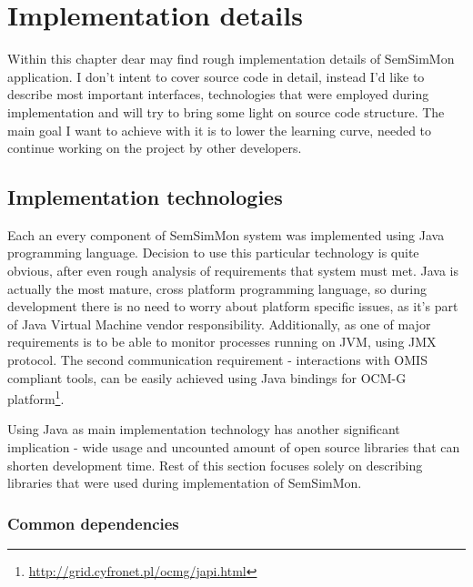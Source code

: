  
%


\chapter{Implementation details}
\label{cha:implementation}

Within this chapter dear may find rough implementation details of SemSimMon application. I don't intent to cover
source code in detail, instead I'd like to describe most important interfaces, technologies  that were
employed during implementation and will try to bring some light on source code structure. The main goal I want to
achieve with it is to lower the learning curve, needed to continue working on the project by other developers.


\section{Implementation technologies}

Each an every component of SemSimMon system was implemented using Java programming language. Decision to use this
particular technology is quite obvious, after even rough analysis of requirements that system must met. Java is
actually the most mature, cross platform programming language, so during development there is no need to worry about
platform specific issues, as it's part of Java Virtual Machine vendor responsibility. Additionally, as one of major
requirements is to be able to monitor processes running on JVM, using JMX protocol. The second communication
requirement - interactions with OMIS compliant tools, can be easily achieved using Java bindings for OCM-G
platform\footnote{\url{http://grid.cyfronet.pl/ocmg/japi.html}}.  

Using Java as main implementation technology has another significant implication - wide usage and uncounted amount of
open source libraries that can shorten development time. Rest of this section focuses solely on describing libraries
that were used during implementation of SemSimMon.



\subsection{Common dependencies}

